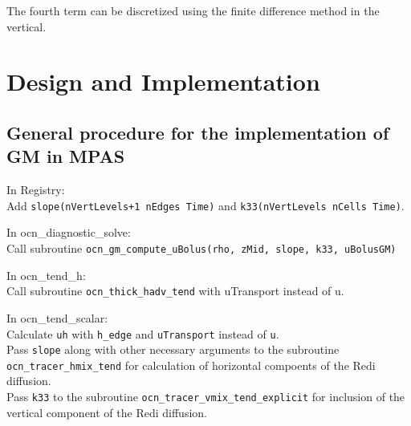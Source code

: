 \documentclass[12pt]{report}
\def\p{\partial}
\begin{document}
The fourth term can be discretized
using the finite difference method in the vertical.




\chapter{Design and Implementation}\label{cha:design-impl}

\section{General procedure for the implementation of GM in MPAS }\label{sec:code-changes}
\noindent In Registry:\\
Add {\tt slope(nVertLevels+1 nEdges Time)} and {\tt k33(nVertLevels nCells Time)}.

\vspace{5mm}
\noindent In ocn\_diagnostic\_solve:\\
Call subroutine {\tt ocn\_gm\_compute\_uBolus(rho, zMid, slope, k33, uBolusGM)}

\vspace{5mm}
\noindent In ocn\_tend\_h:\\
Call subroutine {\tt ocn\_thick\_hadv\_tend} with uTransport instead of u.

\vspace{5mm}
\noindent In ocn\_tend\_scalar:\\
Calculate {\tt uh} with {\tt h\_edge} and {\tt uTransport} instead of
{\tt u}.\\
Pass {\tt slope} along with other necessary arguments to
the subroutine {\tt ocn\_tracer\_hmix\_tend} for calculation of horizontal
compoents of the Redi diffusion.\\
Pass {\tt k33} to the subroutine {\tt ocn\_tracer\_vmix\_tend\_explicit} for inclusion
of the vertical component of the Redi diffusion.
\end{document}
